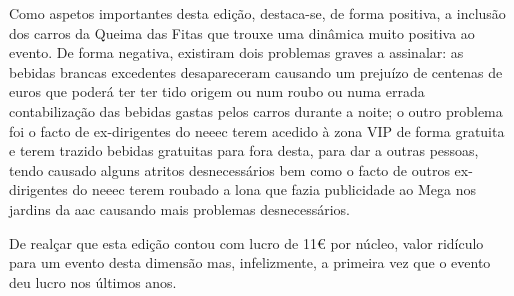 Como aspetos importantes desta edição, destaca-se, de forma positiva, a inclusão dos carros da Queima das Fitas que trouxe uma dinâmica muito positiva ao evento. De forma negativa, existiram dois problemas graves a assinalar: as bebidas brancas excedentes desapareceram causando um prejuízo de centenas de euros que poderá ter ter tido origem ou num roubo ou numa errada contabilização das bebidas gastas pelos carros durante a noite; o outro problema foi o facto de ex-dirigentes do \acrshort{neeec} terem acedido à zona VIP de forma gratuita e terem trazido bebidas gratuitas para fora desta, para dar a outras pessoas, tendo causado alguns atritos desnecessários bem como o facto de outros ex-dirigentes do \acrshort{neeec} terem roubado a lona que fazia publicidade ao Mega nos jardins da \acrshort{aac} causando mais problemas desnecessários.

De realçar que esta edição contou com lucro de 11€ por núcleo, valor ridículo para um evento desta dimensão mas, infelizmente, a primeira vez que o evento deu lucro nos últimos anos.